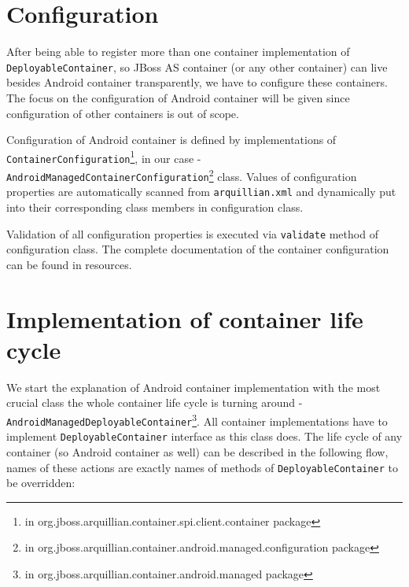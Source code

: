 \documentclass[12pt,final,oneside]{fithesis}
\begin{document}
	\section{Configuration}
	
After being able to register more than one container implementation of \texttt{DeployableContainer}, so JBoss AS container (or any other container) can live besides Android container transparently, we have to configure these containers. The focus on the configuration of Android container will be given since configuration of other containers is out of scope.

Configuration of Android container is defined by implementations of \texttt{ContainerConfiguration}\footnote{in org.jboss.arquillian.container.spi.client.container package}, in our case - \texttt{Android\-Managed\-Container\-Configuration}\footnote{in org.jboss.arquillian.container.android.managed.configuration package} class. Values of configuration properties are automatically scanned from \texttt{arquillian.xml} and dynamically put into their corresponding class members in configuration class.

Validation of all configuration properties is executed via \texttt{validate} method of configuration class. The complete documentation of the container configuration can be found in resources.

	\section{Implementation of container life cycle}	
	
We start the explanation of Android container implementation with the most crucial class the whole container life cycle is turning around - \texttt{AndroidManagedDeployableContainer}\footnote{in org.jboss.arquillian.container.android.managed package}. All container implementations have to implement \texttt{DeployableContainer} interface as this class does. The life cycle of any container (so Android container as well) can be described in the following flow, names of these actions are exactly names of methods of \texttt{DeployableContainer} to be overridden:
\end{document}

